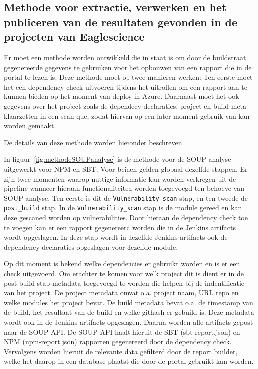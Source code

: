 \begin{itemize}
    \newpage


    \section{Methode voor extractie, verwerken en het publiceren van de resultaten gevonden in de projecten van Eaglescience}\label{subsec:methodeSOUPES}

    Er moet een methode worden ontwikkeld die in staat is om door de buildstraat gegenereerde gegevens te gebruiken voor het opbouwen van een rapport die in de portal te lezen is.
    Deze methode moet op twee manieren werken:
    Ten eerste moet het een dependency check uitvoeren tijdens het uitrollen om een rapport aan te kunnen bieden op het moment van deploy in Azure. Daarnaast moet het ook gegevens over het project zoals de dependecy declaraties, project en build meta klaarzetten in een scan que, zodat hiervan op een later moment gebruik van kan worden gemaakt.

    De details van deze methode worden hieronder beschreven.


    In figuur~\ref{fig:methodeSOUPanalyse} is de methode voor de SOUP analyse uitgewerkt voor NPM en SBT. Voor beiden gelden globaal dezelfde stappen. Er zijn twee momenten waarop nuttige informatie kan worden verkregen uit de pipeline wanneer hieraan functionaliteiten worden toegevoegd ten behoeve van SOUP analyse. Ten eerste is dit de \texttt{Vulnerability\_scan} stap, en ten tweede de \texttt{post\_build} stap. In de \texttt{Vulnerability\_scan} stap is de module gereed en kan deze gescaned worden op vulnerabilities. Door hieraan de dependency check toe te voegen kan er een rapport gegenereerd worden die in de Jenkins artifacts wordt opgeslagen. In deze stap wordt in dezelfde Jenkins artifacts ook de dependency declaraties opgeslagen voor dezelfde module.

    Op dit moment is bekend welke dependencies er gebruikt worden en is er een check uitgevoerd. Om erachter te komen voor welk project dit is dient er in de post build stap metadata toegevoegd te worden die helpen bij de indentificatie van het project. De project metadata omvat o.a. project naam, URL repo en welke modules het project bevat. De build metadata bevat o.a. de timestamp van de build, het resultaat van de build en welke githash er gebuild is. Deze metadata wordt ook in de Jenkins artifacts opgeslagen. Daarna worden alle artifacts gepost naar de SOUP API.
    De SOUP API haalt hieruit de SBT (sbt-report.json) en NPM (npm-report.json) rapporten gegenereerd door de dependency check. Vervolgens worden hieruit de relevante data gefilterd door de report builder, welke het daarop in een database plaatst die door de portal gebruikt kan worden.



\end{itemize}
